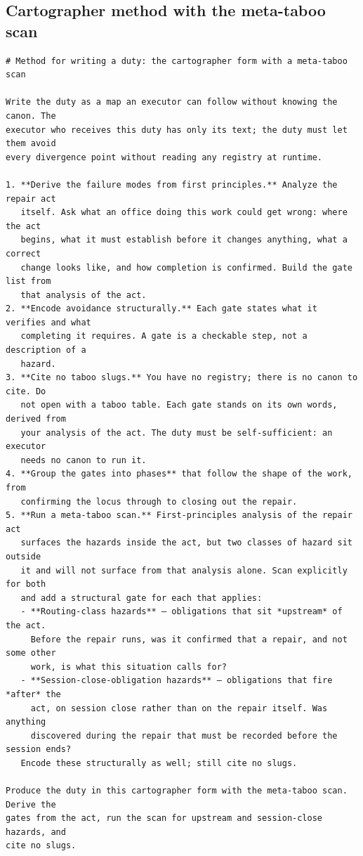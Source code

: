 \documentclass[11pt,a4paper]{article}
\begin{document}
\subsection{Cartographer method with the meta-taboo scan}
\begin{footnotesize}
\begin{verbatim}
# Method for writing a duty: the cartographer form with a meta-taboo scan

Write the duty as a map an executor can follow without knowing the canon. The
executor who receives this duty has only its text; the duty must let them avoid
every divergence point without reading any registry at runtime.

1. **Derive the failure modes from first principles.** Analyze the repair act
   itself. Ask what an office doing this work could get wrong: where the act
   begins, what it must establish before it changes anything, what a correct
   change looks like, and how completion is confirmed. Build the gate list from
   that analysis of the act.
2. **Encode avoidance structurally.** Each gate states what it verifies and what
   completing it requires. A gate is a checkable step, not a description of a
   hazard.
3. **Cite no taboo slugs.** You have no registry; there is no canon to cite. Do
   not open with a taboo table. Each gate stands on its own words, derived from
   your analysis of the act. The duty must be self-sufficient: an executor
   needs no canon to run it.
4. **Group the gates into phases** that follow the shape of the work, from
   confirming the locus through to closing out the repair.
5. **Run a meta-taboo scan.** First-principles analysis of the repair act
   surfaces the hazards inside the act, but two classes of hazard sit outside
   it and will not surface from that analysis alone. Scan explicitly for both
   and add a structural gate for each that applies:
   - **Routing-class hazards** — obligations that sit *upstream* of the act.
     Before the repair runs, was it confirmed that a repair, and not some other
     work, is what this situation calls for?
   - **Session-close-obligation hazards** — obligations that fire *after* the
     act, on session close rather than on the repair itself. Was anything
     discovered during the repair that must be recorded before the session ends?
   Encode these structurally as well; still cite no slugs.

Produce the duty in this cartographer form with the meta-taboo scan. Derive the
gates from the act, run the scan for upstream and session-close hazards, and
cite no slugs.
\end{verbatim}
\end{footnotesize}
\end{document}

